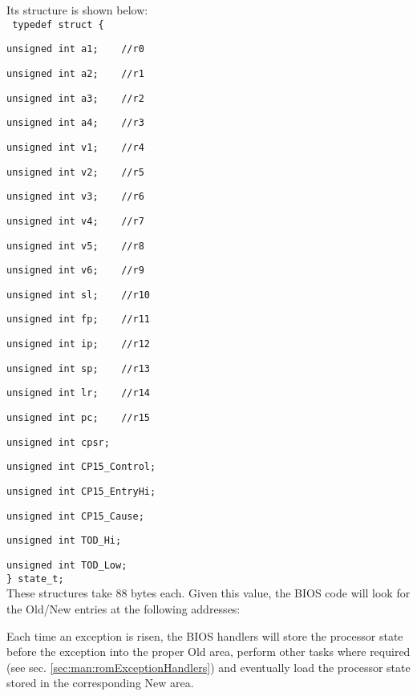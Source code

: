 Its structure is shown below:
\nopagebreak
\\
\texttt{ typedef struct \{}

\nopagebreak
\texttt{unsigned int a1;\ \ \ \ //r0}

\nopagebreak
\texttt{unsigned int a2;\ \ \ \ //r1}

\nopagebreak
\texttt{unsigned int a3;\ \ \ \ //r2}

\nopagebreak
\texttt{unsigned int a4;\ \ \ \ //r3}

\nopagebreak
\texttt{unsigned int v1;\ \ \ \ //r4}

\nopagebreak
\texttt{unsigned int v2;\ \ \ \ //r5}

\nopagebreak
\texttt{unsigned int v3;\ \ \ \ //r6}

\nopagebreak
\texttt{unsigned int v4;\ \ \ \ //r7}

\nopagebreak
\texttt{unsigned int v5;\ \ \ \ //r8}

\nopagebreak
\texttt{unsigned int v6;\ \ \ \ //r9}

\nopagebreak
\texttt{unsigned int sl;\ \ \ \ //r10}

\nopagebreak
\texttt{unsigned int fp;\ \ \ \ //r11}

\nopagebreak
\texttt{unsigned int ip;\ \ \ \ //r12}

\nopagebreak
\texttt{unsigned int sp;\ \ \ \ //r13}

\nopagebreak
\texttt{unsigned int lr;\ \ \ \ //r14}

\nopagebreak
\texttt{unsigned int pc;\ \ \ \ //r15}

\nopagebreak
\texttt{unsigned int cpsr;}

\nopagebreak
\texttt{unsigned int CP15\_Control;}

\nopagebreak
\texttt{unsigned int CP15\_EntryHi;}

\nopagebreak
\texttt{unsigned int CP15\_Cause;}

\nopagebreak
\texttt{unsigned int TOD\_Hi;}

\nopagebreak
\texttt{unsigned int TOD\_Low;}\\
\nopagebreak
\texttt{\} state\_t; }
\\

These structures take 88 bytes each. Given this value, the BIOS code will look for the Old/New entries at the following addresses:


Each time an exception is risen, the BIOS handlers will store the processor state before the exception into the proper Old area, perform other tasks where required (see sec. \ref{sec:man:romExceptionHandlers}) and eventually load the processor state stored in the corresponding New area.

